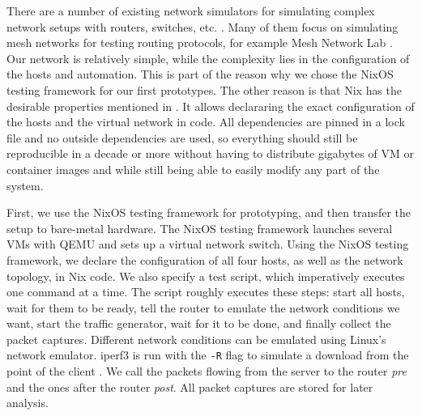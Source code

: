 There are a number of existing network simulators for simulating complex network setups with routers, switches, etc. \cite{network-simulators-list}.
Many of them focus on simulating mesh networks for testing routing protocols, for example Mesh Network Lab \cite{meshnet-lab}.
Our network is relatively simple, while the complexity lies in the configuration of the hosts and automation.
This is part of the reason why we chose the NixOS testing framework for our first prototypes.
The other reason is that Nix has the desirable properties mentioned in .
It allows declararing the exact configuration of the hosts and the virtual network in code.
All dependencies are pinned in a lock file and no outside dependencies are used, so everything should still be reproducible in a decade or more without having to distribute gigabytes of VM or container images and while still being able to easily modify any part of the system.

First, we use the NixOS testing framework for prototyping, and then transfer the setup to bare-metal hardware.
The NixOS testing framework launches several VMs with QEMU and sets up a virtual network switch.
Using the NixOS testing framework, we declare the configuration of all four hosts, as well as the network topology, in Nix code.
We also specify a test script, which imperatively executes one command at a time.
The script roughly executes these steps: start all hosts, wait for them to be ready, tell the router to emulate the network conditions we want, start the traffic generator, wait for it to be done, and finally collect the packet captures.
Different network conditions can be emulated using Linux's network emulator\cite{man8:tc-netem}.
iperf3 is run with the \texttt{-R} flag to simulate a download from the point of the client \cite{man:iperf3}.
We call the packets flowing from the server to the router \textit{pre} and the ones after the router \textit{post}.
All packet captures are stored for later analysis.

